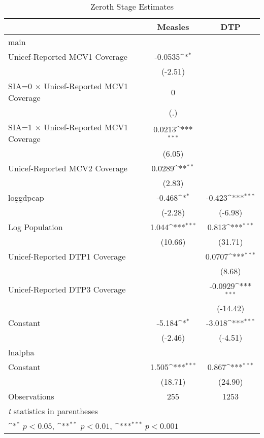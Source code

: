 \begin{table}[htbp]\centering
\def\sym#1{\ifmmode^{#1}\else\(^{#1}\)\fi}
\caption{Zeroth Stage Estimates}
\begin{tabular}{l*{2}{c}}
\hline\hline
                &\multicolumn{1}{c}{Measles}&\multicolumn{1}{c}{DTP}\\
\hline
main            &                  &                  \\
Unicef-Reported MCV1 Coverage&  -0.0535\sym{*}  &                  \\
                &  (-2.51)         &                  \\
[1em]
SIA=0 $\times$ Unicef-Reported MCV1 Coverage&        0         &                  \\
                &      (.)         &                  \\
[1em]
SIA=1 $\times$ Unicef-Reported MCV1 Coverage&   0.0213\sym{***}&                  \\
                &   (6.05)         &                  \\
[1em]
Unicef-Reported MCV2 Coverage&   0.0289\sym{**} &                  \\
                &   (2.83)         &                  \\
[1em]
loggdpcap       &   -0.468\sym{*}  &   -0.423\sym{***}\\
                &  (-2.28)         &  (-6.98)         \\
[1em]
Log Population  &    1.044\sym{***}&    0.813\sym{***}\\
                &  (10.66)         &  (31.71)         \\
[1em]
Unicef-Reported DTP1 Coverage&                  &   0.0707\sym{***}\\
                &                  &   (8.68)         \\
[1em]
Unicef-Reported DTP3 Coverage&                  &  -0.0929\sym{***}\\
                &                  & (-14.42)         \\
[1em]
Constant        &   -5.184\sym{*}  &   -3.018\sym{***}\\
                &  (-2.46)         &  (-4.51)         \\
\hline
lnalpha         &                  &                  \\
Constant        &    1.505\sym{***}&    0.867\sym{***}\\
                &  (18.71)         &  (24.90)         \\
\hline
Observations    &      255         &     1253         \\
\hline\hline
\multicolumn{3}{l}{\footnotesize \textit{t} statistics in parentheses}\\
\multicolumn{3}{l}{\footnotesize \sym{*} \(p<0.05\), \sym{**} \(p<0.01\), \sym{***} \(p<0.001\)}\\
\end{tabular}
\end{table}
